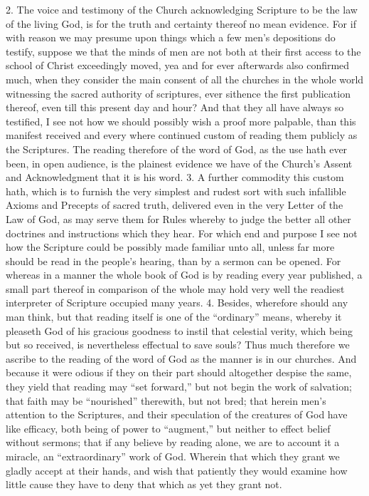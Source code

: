 2. The voice and testimony of the Church acknowledging Scripture to be the law of the living God, is for the truth and certainty thereof no mean evidence. For if with reason we may presume upon things which a few men’s depositions do testify, suppose we that the minds of men are not both at their first access to the school of Christ exceedingly moved, yea and for ever afterwards also confirmed much, when they consider the main consent of all the churches in the whole world witnessing the sacred authority of scriptures, ever sithence the first publication thereof, even till this present day and hour? And that they all have always so testified, I see not how we should possibly wish a proof more palpable, than this manifest received and every where continued custom of reading them publicly as the Scriptures. The reading therefore of the word of God, as the use hath ever been, in open audience, is the plainest evidence we have of the Church’s Assent and Acknowledgment that it is his word.
3. A further commodity this custom hath, which is to furnish the very simplest and rudest sort with such infallible Axioms and Precepts of sacred truth, delivered even in the very Letter of the Law of God, as may serve them for Rules whereby to judge the better all other doctrines and instructions which they hear. For which end and purpose I see not  how the Scripture could be possibly made familiar unto all, unless far more should be read in the people’s hearing, than by a sermon can be opened. For whereas in a manner the whole book of God is by reading every year published, a small part thereof in comparison of the whole may hold very well the readiest interpreter of Scripture occupied many years.
4. Besides, wherefore should any man think, but that reading itself is one of the “ordinary” means, whereby it pleaseth God of his gracious goodness to instil that celestial verity, which being but so received, is nevertheless effectual to save souls? Thus much therefore we ascribe to the reading of the word of God as the manner is in our churches.
And because it were odious if they on their part should altogether despise the same, they yield that reading may “set forward,” but not begin the work of salvation; that faith may be “nourished” therewith, but not bred; that herein men’s attention to the Scriptures, and their speculation of the creatures of God have like efficacy, both being of power to “augment,” but neither to effect belief without sermons; that if any believe by reading alone, we are to account it a miracle, an “extraordinary” work of God. Wherein that which they grant we gladly accept at their hands, and wish that patiently they would examine how little cause they have to deny that which as yet they grant not.
